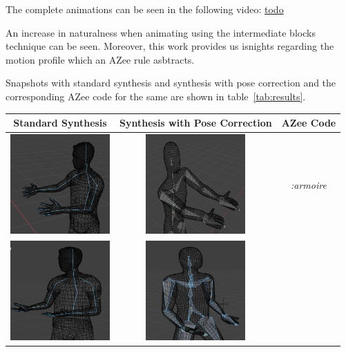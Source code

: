 \documentclass[../../main.tex]{subfiles}
\begin{document}
The complete animations can be seen in the following video: \url{todo}

An increase in naturalness when animating using the intermediate blocks technique can be seen. Moreover, this work provides us isnights regarding the motion profile which an AZee rule asbtracts.

Snapshots with standard synthesis and synthesis with pose correction and the corresponding AZee code for the same are shown in table~\ref{tab:results}.

\begin{table}
  \centering
  \begin{tabular}{|c|c|c|}
    \hline
    \textbf{Standard Synthesis} & \textbf{Synthesis with Pose Correction} & \textbf{AZee Code} \\
    \hline
    \includegraphics[width = 1.5in]{chapters/intermediate_blocks_pose_correction/images/standard_synthesis_armoire.png} & \includegraphics[width = 1.5in]{chapters/intermediate_blocks_pose_correction/images/pose_correction_synthesis_armoire.png} & 
      \emph{:armoire} \\
    \hline
    \includegraphics[width = 1.5in]{chapters/intermediate_blocks_pose_correction/images/standard_synthesis_maintenant.png} & \includegraphics[width = 1.5in]{chapters/intermediate_blocks_pose_correction/images/pose_correction_synthesis_maintenant.png} &

\end{tabular}
\end{table}
\end{document}

